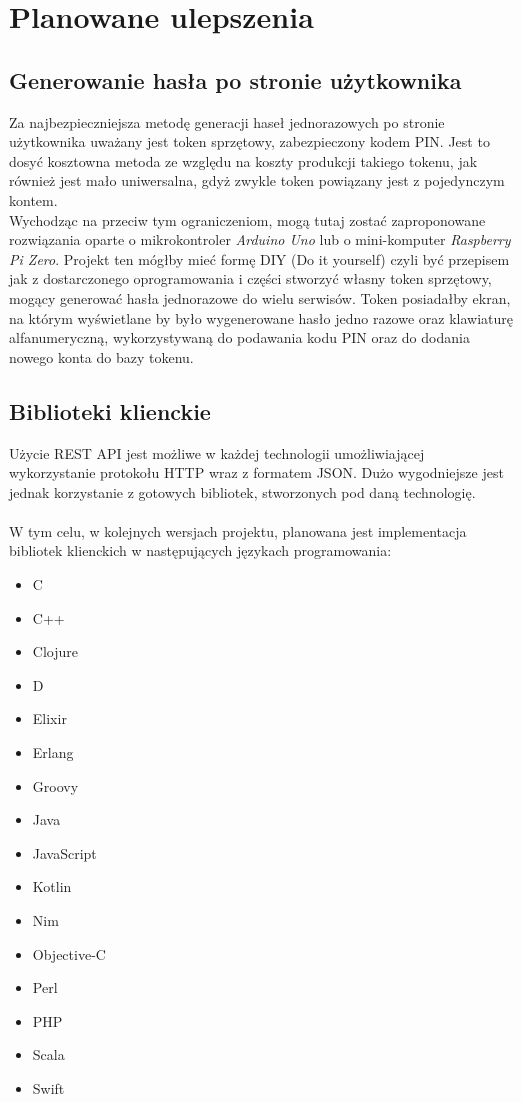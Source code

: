 \section{Planowane ulepszenia}

\subsection{Generowanie hasła po stronie użytkownika}
Za najbezpieczniejsza metodę generacji haseł jednorazowych po stronie użytkownika uważany jest 
token sprzętowy, zabezpieczony kodem PIN. 
Jest to dosyć kosztowna metoda ze względu na koszty produkcji takiego tokenu, jak również 
jest mało uniwersalna, gdyż zwykle token powiązany jest z pojedynczym kontem. \\
Wychodząc na przeciw tym ograniczeniom, mogą tutaj zostać zaproponowane rozwiązania 
oparte o mikrokontroler \textit{Arduino Uno} lub o mini-komputer \textit{Raspberry Pi Zero}.
Projekt ten mógłby mieć formę DIY (Do it yourself) czyli być przepisem jak z dostarczonego 
oprogramowania i części stworzyć własny token sprzętowy, mogący generować hasła jednorazowe do wielu serwisów. 
Token posiadałby ekran, na którym wyświetlane by było wygenerowane hasło jedno razowe oraz klawiaturę 
alfanumeryczną, wykorzystywaną do podawania kodu PIN oraz do dodania nowego konta do bazy tokenu.

\subsection{Biblioteki klienckie}
Użycie REST API jest możliwe w każdej technologii umożliwiającej wykorzystanie protokołu HTTP 
wraz z formatem JSON. 
Dużo wygodniejsze jest jednak korzystanie z gotowych bibliotek, stworzonych pod daną technologię. \\ \\
W tym celu, w kolejnych wersjach projektu, planowana jest implementacja bibliotek klienckich w następujących 
językach programowania:
\begin{itemize}
	\item{C}
	\item{C++}
	\item{Clojure}
	\item{D}
	\item{Elixir}
	\item{Erlang}
	\item{Groovy}
	\item{Java}
	\item{JavaScript}
	\item{Kotlin}
	\item{Nim}
	\item{Objective-C}
	\item{Perl}
	\item{PHP}
	\item{Scala}
	\item{Swift}
\end{itemize}

